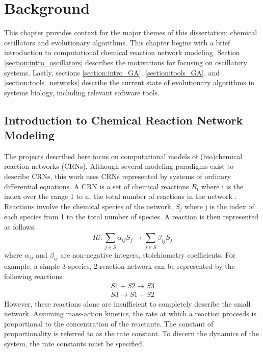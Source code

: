 \documentclass[12pt]{report}
\begin{document}
\chapter{Background}

This chapter provides context for the major themes of this dissertation: chemical oscillators and evolutionary algorithms. This chapter begins with a brief introduction to computational chemical reaction network modeling. Section \ref{section:intro_oscillators} describes the motivations for focusing on oscillatory systems. Lastly, sections \ref{section:intro_GA}, \ref{section:tools_GA}, and \ref{section:tools_networks} describe the current state of evolutionary algorithms in systems biology, including relevant software tools.


\section{Introduction to Chemical Reaction Network Modeling}
\label{section:intro_crn}
The projects described here focus on computational models of (bio)chemical reaction networks (CRNs). Although several modeling paradigms exist to describe CRNs, this work uses CRNs represented by systems of ordinary differential equations. A CRN is a set of chemical reactions $R_i$ where i is the index over the range 1 to n, the total number of reactions in the network . Reactions involve the chemical species of the network, $S_j$ where j is the index of each species from 1 to the total number of species. A reaction is then represented as follows:
\begin{equation*}
Ri: \sum_{j\in S}^{}\alpha_{ij}S_j\to \sum_{j\in S}^{}\beta_{ij}S_j
\end{equation*}
where $\alpha_{ij}$ and $\beta_{ij}$ are non-negative integers, stoichiometry coefficients. For example, a simple 3-species, 2-reaction network can be represented by the following reactions:
\begin{equation}
\begin{split}
S1 + S2 \to S3 \\
S3 \to S1 + S2
\end{split}
\end{equation}
However, these reactions alone are insufficient to completely describe the small network.  Assuming mass-action kinetics, the rate at which a reaction proceeds is proportional to the concentration of the reactants. The constant of proportionality is referred to as the rate constant. To discern the dynamics of the system, the rate constants must be specified.
\end{document}
